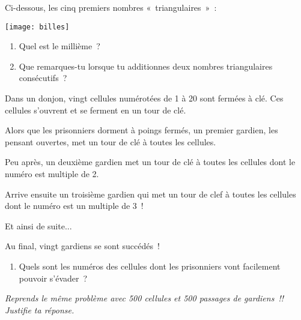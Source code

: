 \begin{enigme}

Ci-dessous, les cinq premiers nombres « triangulaires » :
\vspace{-1.5cm} 
\begin{center} \texttt{[image: billes]} \end{center} 

\begin{enumerate}
 \item Quel est le millième ?
 \item Que remarques-tu lorsque tu additionnes deux nombres triangulaires consécutifs ? 
 \end{enumerate}
 
 \end{enigme}
 
 \vspace*{2em}

\begin{enigme}[Geôle]
Dans un donjon, vingt cellules numérotées de 1 à 20 sont fermées à clé. Ces cellules s'ouvrent et se ferment en un tour de clé.

Alors que les prisonniers dorment à poings fermés, un premier gardien, les pensant ouvertes, met un tour de clé à toutes les cellules.

Peu après, un deuxième gardien met un tour de clé à toutes les cellules dont le numéro est multiple de 2.

Arrive ensuite un troisième gardien qui met un tour de clef à toutes les cellules dont le numéro est un multiple de 3 !

Et ainsi de suite...

Au final, vingt gardiens se sont succédés !

\begin{enumerate}
 \item Quels sont les numéros des cellules dont les prisonniers vont facilement pouvoir s'évader ?
 \end{enumerate}
 
\emph{Reprends le même problème avec 500 cellules et 500 passages de gardiens !! Justifie ta réponse.}
\end{enigme} 
